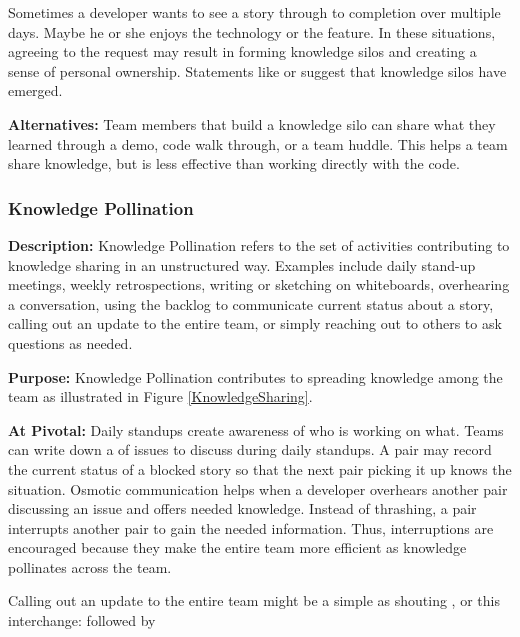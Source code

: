 Sometimes a developer wants to see a story through to completion over multiple days. Maybe he or she enjoys the technology or the feature. In these situations, agreeing to the request may result in forming knowledge silos and creating a sense of personal ownership. Statements like  or  suggest that knowledge silos have emerged. 

\textbf{Alternatives:} Team members that build a knowledge silo can share what they learned through a demo, code walk through, or a team huddle. This helps a team share knowledge, but is less effective than working directly with the code. 

\subsubsection{Knowledge Pollination}
\textbf{Description:} Knowledge Pollination refers to the set of activities contributing to knowledge sharing in an unstructured way. Examples include daily stand-up meetings, weekly retrospections, writing or sketching on whiteboards, overhearing a conversation, using the backlog to communicate current status about a story, calling out an update to the entire team, or simply reaching out to others to ask questions as needed. 

\textbf{Purpose:} Knowledge Pollination contributes to spreading knowledge among the team as illustrated in Figure \ref{KnowledgeSharing}.

\textbf{At Pivotal:} Daily standups create awareness of who is working on what. Teams can write down a  of issues to discuss during daily standups. A pair may record the current status of a blocked story so that the next pair picking it up knows the situation. Osmotic communication helps when a developer overhears another pair discussing an issue and offers needed knowledge. Instead of thrashing, a pair interrupts another pair to gain the needed information. Thus, interruptions are encouraged because they make the entire team more efficient as knowledge pollinates across the team. 

Calling out an update to the entire team might be a simple as shouting , or this interchange:  followed by 

